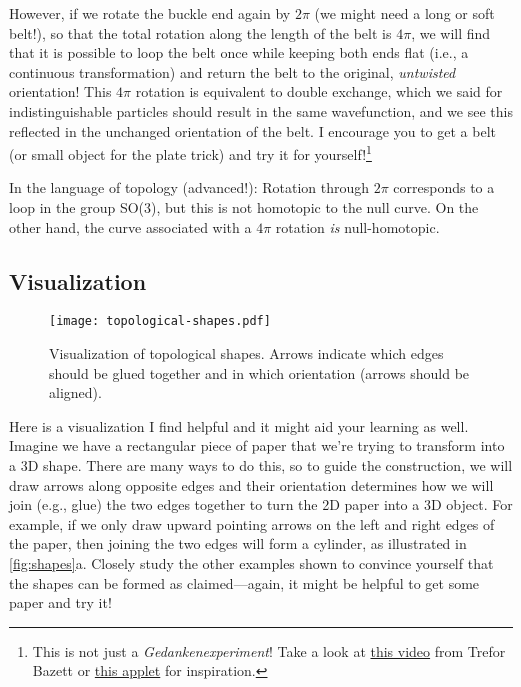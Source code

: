 \documentclass[12pt, english]{book}
\begin{document}
However, if we rotate the buckle end again by $2\pi$ (we might need a long or soft belt!), so that the total rotation along the length of the belt is $4\pi$, we will find that it is possible to loop the belt once while keeping both ends flat (i.e., a continuous transformation) and return the belt to the original, \emph{untwisted} orientation!
This $4\pi$ rotation is equivalent to double exchange, which we said for indistinguishable particles should result in the same wavefunction, and we see this reflected in the unchanged orientation of the belt.
I encourage you to get a belt (or small object for the plate trick) and try it for yourself!\footnote{This is not just a \emph{Gedankenexperiment}! Take a look at \href{https://www.youtube.com/watch?v=EgsUDby0X1M}{this video} from Trefor Bazett or \href{https://www.gregegan.net/APPLETS/21/21.html}{this applet} for inspiration.}

In the language of topology (advanced!): Rotation through $2\pi$ corresponds to a loop in the group SO(3), but this is not homotopic to the null curve.
On the other hand, the curve associated with a $4\pi$ rotation \emph{is} null-homotopic.

\subsection{Visualization}

\begin{figure}[!ht]
	\centering 
	\texttt{[image: topological-shapes.pdf]}
	\caption{Visualization of topological shapes. 
	Arrows indicate which edges should be glued together and in which orientation (arrows should be aligned).}
	\label{fig:shapes}
\end{figure}

Here is a visualization I find helpful and it might aid your learning as well.
Imagine we have a rectangular piece of paper that we're trying to transform into a 3D shape.
There are many ways to do this, so to guide the construction, we will draw arrows along opposite edges and their orientation determines how we will join (e.g., glue) the two edges together to turn the 2D paper into a 3D object.
For example, if we only draw upward pointing arrows on the left and right edges of the paper, then joining the two edges will form a cylinder, as illustrated in \autoref{fig:shapes}a.
Closely study the other examples shown to convince yourself that the shapes can be formed as claimed---again, it might be helpful to get some paper and try it!
\end{document}
